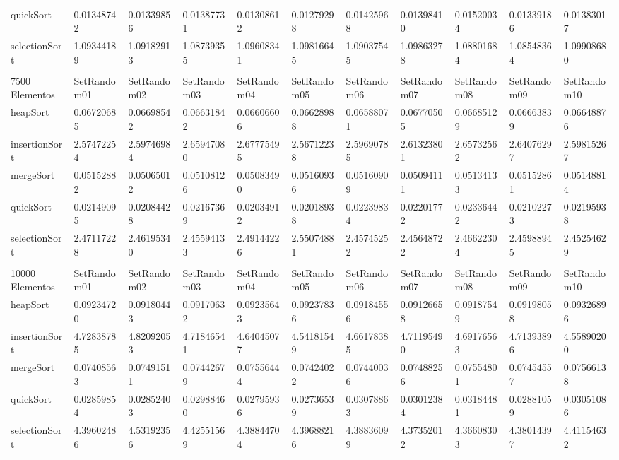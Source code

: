 \documentclass[article,a4paper]{article}
\begin{document}
\begin{table}[h]
{\begin{tabular}{lllllllllll}
quickSort       & 0.01348742  & 0.01339856  & 0.01387731  & 0.01308612  & 0.01279298  & 0.01425968  & 0.01398410  & 0.01520034  & 0.01339186  & 0.01383017  \\
selectionSort   & 1.09344189  & 1.09182913  & 1.08739355  & 1.09608341  & 1.09816645  & 1.09037545  & 1.09863278  & 1.08801684  & 1.08548364  & 1.09908680  \\
                &             &             &             &             &             &             &             &             &             &             \\
7500 Elementos  & SetRandom01 & SetRandom02 & SetRandom03 & SetRandom04 & SetRandom05 & SetRandom06 & SetRandom07 & SetRandom08 & SetRandom09 & SetRandom10 \\
heapSort        & 0.06720685  & 0.06698542  & 0.06631842  & 0.06606606  & 0.06628988  & 0.06588071  & 0.06770505  & 0.06685129  & 0.06663839  & 0.06648876  \\
insertionSort   & 2.57472254  & 2.59746984  & 2.65947080  & 2.67775495  & 2.56712238  & 2.59690785  & 2.61323801  & 2.65732562  & 2.64076297  & 2.59815267  \\
mergeSort       & 0.05152882  & 0.05065012  & 0.05108126  & 0.05083490  & 0.05160936  & 0.05160909  & 0.05094111  & 0.05134133  & 0.05152861  & 0.05148814  \\
quickSort       & 0.02149095  & 0.02084428  & 0.02167369  & 0.02034912  & 0.02018938  & 0.02239834  & 0.02201772  & 0.02336442  & 0.02102273  & 0.02195938  \\
selectionSort   & 2.47117228  & 2.46195340  & 2.45594133  & 2.49144226  & 2.55074881  & 2.45745252  & 2.45648722  & 2.46622304  & 2.45988945  & 2.45254629  \\
                &             &             &             &             &             &             &             &             &             &             \\
10000 Elementos & SetRandom01 & SetRandom02 & SetRandom03 & SetRandom04 & SetRandom05 & SetRandom06 & SetRandom07 & SetRandom08 & SetRandom09 & SetRandom10 \\
heapSort        & 0.09234720  & 0.09180443  & 0.09170632  & 0.09235643  & 0.09237836  & 0.09184556  & 0.09126658  & 0.09187549  & 0.09198058  & 0.09326896  \\
insertionSort   & 4.72838785  & 4.82092053  & 4.71846541  & 4.64045077  & 4.54181549  & 4.66178385  & 4.71195490  & 4.69176563  & 4.71393896  & 4.55890200  \\
mergeSort       & 0.07408563  & 0.07491511  & 0.07442679  & 0.07556444  & 0.07424022  & 0.07440036  & 0.07488256  & 0.07554801  & 0.07454557  & 0.07566138  \\
quickSort       & 0.02859854  & 0.02852403  & 0.02988460  & 0.02795936  & 0.02736539  & 0.03078863  & 0.03012384  & 0.03184481  & 0.02881059  & 0.03051086  \\
selectionSort   & 4.39602486  & 4.53192356  & 4.42551569  & 4.38844704  & 4.39688216  & 4.38836099  & 4.37352012  & 4.36608303  & 4.38014397  & 4.41154632 
\end{tabular}}
\end{table}
\end{document}
